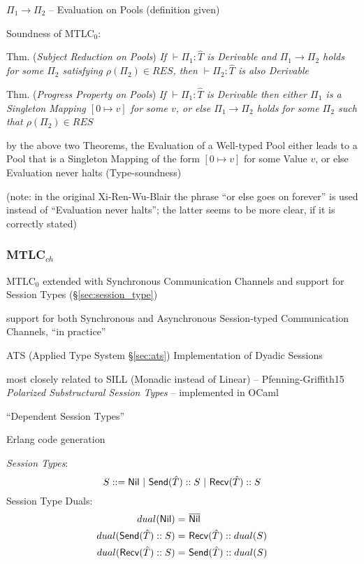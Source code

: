 $\Pi_1 \rightarrow \Pi_2$ -- Evaluation on Pools (definition given)

Soundness of MTLC$_0$:

Thm. (\emph{Subject Reduction on Pools}) \emph{If $\vdash \Pi_1 :
  \hat{T}$ is Derivable and $\Pi_1 \rightarrow \Pi_2$ holds for some
  $\Pi_2$ satisfying $\rho(\Pi_2) \in RES$, then $\vdash \Pi_2 :
  \hat{T}$ is also Derivable}

Thm. (\emph{Progress Property on Pools}) \emph{If $\vdash\Pi_1 :
  \hat{T}$ is Derivable then either $\Pi_1$ is a Singleton Mapping $[0
    \mapsto v]$ for some $v$, or else $\Pi_1 \rightarrow \Pi_2$ holds
  for some $\Pi_2$ such that $\rho(\Pi_2) \in RES$}

by the above two Theorems, the Evaluation of a Well-typed Pool either
leads to a Pool that is a Singleton Mapping of the form $[0 \mapsto
  v]$ for some Value $v$, or else Evaluation never halts
(Type-soundness)

(note: in the original Xi-Ren-Wu-Blair the phrase ``or else goes on
forever'' is used instead of ``Evaluation never halts''; the latter
seems to be more clear, if it is correctly stated)



\subsubsection{MTLC$_{ch}$}\label{sec:mtlc_ch}

MTLC$_0$ extended with Synchronous Communication Channels and support
for Session Types (\S\ref{sec:session_type})

support for both Synchronous and Asynchronous Session-typed
Communication Channels, ``in practice'' %

ATS (Applied Type System \S\ref{sec:ats}) Implementation of Dyadic
Sessions

most closely related to SILL (Monadic instead of Linear) --
Pfenning-Griffith15 \emph{Polarized Substructural Session Types} --
implemented in OCaml %

``Dependent Session Types''

Erlang code generation

\emph{Session Types}:
\[
  S ::= \Nil \ |\ \Send(\hat{T}) :: S \ |\ \Recv(\hat{T}) :: S
\]
Session Type Duals:
\begin{align*}
  dual(\mathsf{Nil})              =&\ \overline{\mathsf{Nil}} \\
  dual(\mathsf{Send}(\hat{T})::S) =&\ \mathsf{Recv}(\hat{T}) :: dual(S) \\
  dual(\mathsf{Recv}(\hat{T})::S) =&\ \mathsf{Send}(\hat{T}) :: dual(S)
\end{align*}

